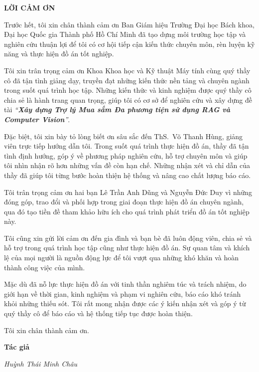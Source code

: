 \begin{center}
    \textbf{\Large LỜI CẢM ƠN}
\end{center}

Trước hết, tôi xin chân thành cảm ơn Ban Giám hiệu Trường Đại học Bách khoa, Đại học Quốc gia Thành phố Hồ Chí Minh đã tạo dựng môi trường học tập và nghiên cứu thuận lợi để tôi có cơ hội tiếp cận kiến thức chuyên môn, rèn luyện kỹ năng và thực hiện đồ án tốt nghiệp.

Tôi xin trân trọng cảm ơn Khoa Khoa học và Kỹ thuật Máy tính cùng quý thầy cô đã tận tình giảng dạy, truyền đạt những kiến thức nền tảng và chuyên ngành trong suốt quá trình học tập. Những kiến thức và kinh nghiệm được quý thầy cô chia sẻ là hành trang quan trọng, giúp tôi có cơ sở để nghiên cứu và xây dựng đề tài \textit{\enquote{\textbf{Xây dựng Trợ lý Mua sắm Đa phương tiện sử dụng RAG và Computer Vision}}}.

Đặc biệt, tôi xin bày tỏ lòng biết ơn sâu sắc đến ThS.~Võ Thanh Hùng, giảng viên trực tiếp hướng dẫn tôi. Trong suốt quá trình thực hiện đồ án, thầy đã tận tình định hướng, góp ý về phương pháp nghiên cứu, hỗ trợ chuyên môn và giúp tôi nhìn nhận rõ hơn những vấn đề còn hạn chế. Những nhận xét và chỉ dẫn của thầy đã giúp tôi từng bước hoàn thiện hệ thống và nâng cao chất lượng báo cáo.

Tôi trân trọng cảm ơn hai bạn Lê Trần Anh Dũng và Nguyễn Đức Duy vì những đóng góp, trao đổi và phối hợp trong giai đoạn thực hiện đồ án chuyên ngành, qua đó tạo tiền đề tham khảo hữu ích cho quá trình phát triển đồ án tốt nghiệp này.

Tôi cũng xin gửi lời cảm ơn đến gia đình và bạn bè đã luôn động viên, chia sẻ và hỗ trợ trong quá trình học tập cũng như thực hiện đồ án. Sự quan tâm và khích lệ của mọi người là nguồn động lực để tôi vượt qua những khó khăn và hoàn thành công việc của mình.

Mặc dù đã nỗ lực thực hiện đồ án với tinh thần nghiêm túc và trách nhiệm, do giới hạn về thời gian, kinh nghiệm và phạm vi nghiên cứu, báo cáo khó tránh khỏi những thiếu sót. Tôi rất mong nhận được các ý kiến nhận xét và góp ý từ quý thầy cô để báo cáo và hệ thống tiếp tục được hoàn thiện.

Tôi xin chân thành cảm ơn.

\vspace{1cm}

\par\hfill\textbf{Tác giả}

\par\hfill\textit{Huỳnh Thái Minh Châu}
\newpage
